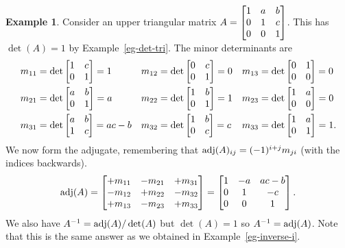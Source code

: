 \documentclass[reqno]{amsart}
\theoremstyle{definition}
\newtheorem{example}[theorem]{Example}
\begin{document}
\begin{example}\label{eg-adjugate-tri}
 Consider an upper triangular matrix
 $A=\left[\begin{matrix} 1&a&b \\
         0&1&c \\
         0&0&1\end{matrix}\right]$.
 This has $\det(A)=1$ by Example~\ref{eg-det-tri}.  The minor
 determinants are
 \begin{align*}
  m_{11} &= \det\left[\begin{matrix} 1&c\\0&1\end{matrix}\right] = 1 &
  m_{12} &= \det\left[\begin{matrix} 0&c\\0&1\end{matrix}\right] = 0 &
  m_{13} &= \det\left[\begin{matrix} 0&1\\0&0\end{matrix}\right] = 0 \\
  m_{21} &= \det\left[\begin{matrix} a&b\\0&1\end{matrix}\right] = a &
  m_{22} &= \det\left[\begin{matrix} 1&b\\0&1\end{matrix}\right] = 1 &
  m_{23} &= \det\left[\begin{matrix} 1&a\\0&0\end{matrix}\right] = 0 \\
  m_{31} &= \det\left[\begin{matrix} a&b\\1&c\end{matrix}\right] = ac-b &
  m_{32} &= \det\left[\begin{matrix} 1&b\\0&c\end{matrix}\right] = c &
  m_{33} &= \det\left[\begin{matrix} 1&a\\0&1\end{matrix}\right] = 1.
 \end{align*}
 We now form the adjugate, remembering that
 $\operatorname{adj}(A)_{ij}=(-1)^{i+j}m_{ji}$ (with the indices backwards).
 \[
   \operatorname{adj}(A) =
   \left[\begin{matrix} +m_{11} & -m_{21} & +m_{31} \\
        -m_{12} & +m_{22} & -m_{32} \\
        +m_{13} & -m_{23} & +m_{33}
   \end{matrix}\right]
   =
   \left[\begin{matrix}
    1 & -a & ac-b \\ 0 & 1 & -c \\ 0 & 0 & 1
   \end{matrix}\right].
 \]
 We also have $A^{-1}=\operatorname{adj}(A)/\det(A)$ but $\det(A)=1$ so
 $A^{-1}=\operatorname{adj}(A)$.  Note that this is the same answer as we obtained
 in Example~\ref{eg-inverse-i}.
\end{example}
\end{document}
